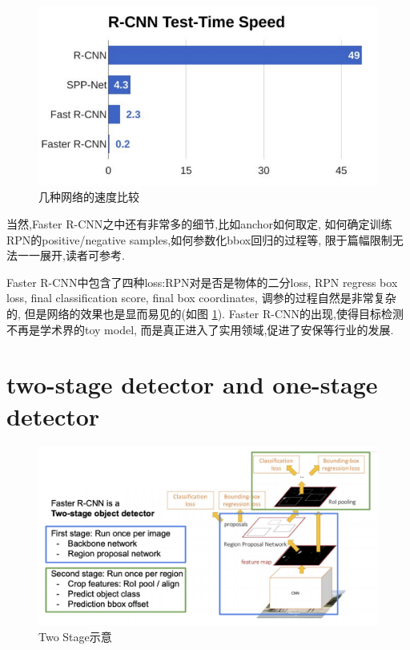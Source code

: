 \begin{figure}
    \includegraphics[scale=0.4]{figures/rcnn_speed_comparison.png}
    \caption{几种网络的速度比较}
    \label{fig:rcnn_speed}
\end{figure}

当然,Faster R-CNN之中还有非常多的细节,比如anchor如何取定,
如何确定训练RPN的positive/negative samples,如何参数化bbox回归的过程等,
限于篇幅限制无法一一展开,读者可参考\cite{FasterRCNN}.

Faster R-CNN中包含了四种loss:RPN对是否是物体的二分loss,
RPN regress box loss, final classification score, 
final box coordinates, 调参的过程自然是非常复杂的,
但是网络的效果也是显而易见的(如图 \ref{fig:rcnn_speed}).
Faster R-CNN的出现,使得目标检测不再是学术界的toy model, 
而是真正进入了实用领域,促进了安保等行业的发展.

\section{two-stage detector and one-stage detector}

\begin{figure}[htbp]
    \centering
    \includegraphics[scale=0.45]{figures/two_stage_detector.png}
    \caption{Two Stage示意}
\end{figure}

